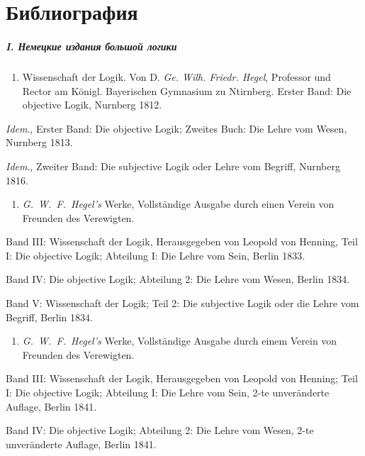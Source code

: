 \bigskip

\clearpage
\chapter[Библиография]{Библиография}
\paragraph[I. Немецкие издания большой логики]
{I. Немецкие издания большой логики}

\begin{enumerate}
\item
Wissenschaft der Logik. Von D. {\em Ge. Wilh. Friedr. Hegel},
Professor und Rector am Königl. Bayerischen Gymnasium zu Ntirnberg.
Erster Band: Die objective Logik, Nurnberg 1812.
\end{enumerate}

{\em Idem}., Erster Band: Die objective Logik; Zweites Buch: Die Lehre
vom Wesen, Nurnberg 1813.

{\em Idem}., Zweiter Band: Die subjective Logik oder Lehre vom Begriff,
Nurnberg 1816.

\begin{enumerate}
\item
{\em G.~W.~F.~Hegel's} Werke, Vollständige Ausgabe durch einen Verein von
Freunden des Verewigten.
\end{enumerate}

Band III: Wissenschaft der Logik, Herausgegeben von
Leopold von Henning, Teil I: Die objective Logik; Abteilung I: Die Lehre
vom Sein, Berlin 1833.

Band IV: Die objective Logik; Abteilung 2: Die Lehre vom Wesen, Berlin 1834.

Band V: Wissenschaft der Logik; Teil 2: Die subjective Logik oder die Lehre
vom Begriff, Berlin 1834.

\begin{enumerate}
\item
{\em G.~W.~F.~Hegel's} Werke, Vollständige Ausgabe durch einem Verein von
Freunden des Verewigten.
\end{enumerate}

Band III: Wissenschaft der Logik, Herausgegeben von Leopold von Henning;
Teil I: Die objective Logik; Abteilung I: Die Lehre vom Sein, 2-te
unveränderte Auflage, Berlin 1841.

Band IV: Die objective Logik; Abteilung 2: Die Lehre vom Wesen, 2-te
unveränderte Auflage, Berlin 1841.

